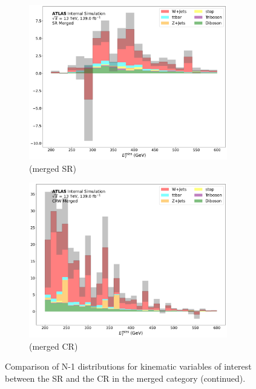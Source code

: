 \begin{figure}[htbp]
   \begin{subfigure}{0.45\textwidth}
     \includegraphics[width = 0.95\textwidth]{Figures/App_SR_CR_distributions/SR1L_Merged/MetTST_met_N_1.pdf}
    \caption{\met (merged SR)}
    \label{fig:N_1_SR_merged_met}
     \end{subfigure}
    \begin{subfigure}{0.45\textwidth}
     \includegraphics[width = 0.95\textwidth]{Figures/App_SR_CR_distributions/CRW_Merged/MetTST_met_N_1.pdf}
     \caption{\met (merged \wjets CR)}
     \label{fig:N_1_CRW_merged_met}
     \end{subfigure}
     \caption{Comparison of N-1 distributions for kinematic variables of interest between the SR and the \wjets CR in the merged category (continued).}
  \end{figure}
  

